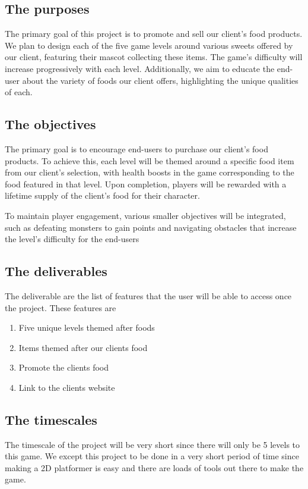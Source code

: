 \documentclass{article}
\begin{document}
\subsection{The purposes}
The primary goal of this project is to promote and sell our client's food products. We plan to design each of the five game levels around various sweets offered by our client, featuring their mascot collecting these items. The game's difficulty will increase progressively with each level. Additionally, we aim to educate the end-user about the variety of foods our client offers, highlighting the unique qualities of each.

\subsection{The objectives}
The primary goal is to encourage end-users to purchase our client's food products. To achieve this, each level will be themed around a specific food item from our client's selection, with health boosts in the game corresponding to the food featured in that level. Upon completion, players will be rewarded with a lifetime supply of the client's food for their character.

To maintain player engagement, various smaller objectives will be integrated, such as defeating monsters to gain points and navigating obstacles that increase the level's difficulty for the end-users


\subsection{The deliverables}
The deliverable are the list of features that the user will be able to access once the project. These features are
\begin{enumerate}
    \item Five unique levels themed after foods
    \item Items themed after our clients food
    \item Promote the clients food
    \item Link to the clients website
\end{enumerate}
 

\subsection{The timescales}
The timescale of the project will be very short since there will only be 5 levels to this game. We except this project to be done in a very short period of time since making a 2D platformer is easy and there are loads of tools out there to make the game.
\end{document}
